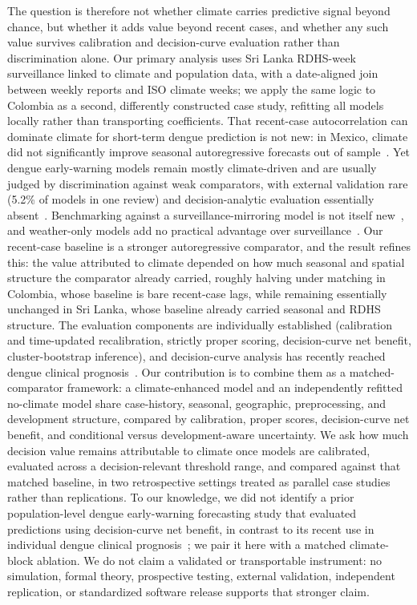 \documentclass[11pt,a4paper]{article}
\begin{document}
The question is therefore not whether climate carries predictive signal beyond chance, but whether it adds value beyond recent cases, and whether any such value survives calibration and decision-curve evaluation rather than discrimination alone. Our primary analysis uses Sri Lanka RDHS-week surveillance linked to climate and population data, with a date-aligned join between weekly reports and ISO climate weeks; we apply the same logic to Colombia as a second, differently constructed case study, refitting all models locally rather than transporting coefficients. That recent-case autocorrelation can dominate climate for short-term dengue prediction is not new: in Mexico, climate did not significantly improve seasonal autoregressive forecasts out of sample~\cite{Johansson2016}. Yet dengue early-warning models remain mostly climate-driven and are usually judged by discrimination against weak comparators, with external validation rare (5.2\% of models in one review) and decision-analytic evaluation essentially absent~\cite{Leung2022,HussainAlkhateeb2021}. Benchmarking against a surveillance-mirroring model is not itself new~\cite{Lowe2013}, and weather-only models add no practical advantage over surveillance~\cite{Benedum2020}. Our recent-case baseline is a stronger autoregressive comparator, and the result refines this: the value attributed to climate depended on how much seasonal and spatial structure the comparator already carried, roughly halving under matching in Colombia, whose baseline is bare recent-case lags, while remaining essentially unchanged in Sri Lanka, whose baseline already carried seasonal and RDHS structure. The evaluation components are individually established (calibration and time-updated recalibration, strictly proper scoring, decision-curve net benefit, cluster-bootstrap inference), and decision-curve analysis has recently reached dengue clinical prognosis~\cite{Sangkaew2026,Vickers2006,Binuya2022}. Our contribution is to combine them as a matched-comparator framework: a climate-enhanced model and an independently refitted no-climate model share case-history, seasonal, geographic, preprocessing, and development structure, compared by calibration, proper scores, decision-curve net benefit, and conditional versus development-aware uncertainty. We ask how much decision value remains attributable to climate once models are calibrated, evaluated across a decision-relevant threshold range, and compared against that matched baseline, in two retrospective settings treated as parallel case studies rather than replications. %
To our knowledge, we did not identify a prior population-level dengue early-warning forecasting study that evaluated predictions using decision-curve net benefit, in contrast to its recent use in individual dengue clinical prognosis~\cite{Sangkaew2026}; we pair it here with a matched climate-block ablation. We do not claim a validated or transportable instrument: no simulation, formal theory, prospective testing, external validation, independent replication, or standardized software release supports that stronger claim.
\end{document}
